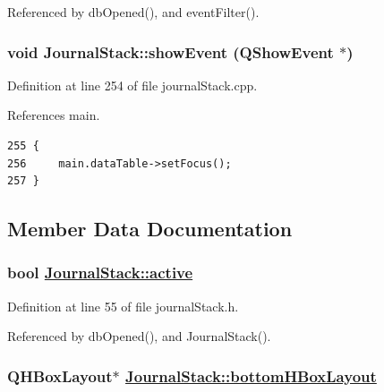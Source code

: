 Referenced by db\-Opened(), and event\-Filter().\hypertarget{classJournalStack_d1}{
\subsubsection[showEvent]{\setlength{\rightskip}{0pt plus 5cm}void Journal\-Stack::show\-Event (QShow\-Event $\ast$)}}
\label{classJournalStack_d1}


Definition at line 254 of file journal\-Stack.cpp.

References main.

\footnotesize\begin{verbatim}255 {
256     main.dataTable->setFocus();
257 }
\end{verbatim}\normalsize 




\subsection{Member Data Documentation}
\hypertarget{classJournalStack_r5}{
\subsubsection[active]{\setlength{\rightskip}{0pt plus 5cm}bool \hyperlink{classJournalStack_r5}{Journal\-Stack::active}}}
\label{classJournalStack_r5}


Definition at line 55 of file journal\-Stack.h.

Referenced by db\-Opened(), and Journal\-Stack().\hypertarget{classJournalStack_r16}{
\subsubsection[bottomHBoxLayout]{\setlength{\rightskip}{0pt plus 5cm}QHBox\-Layout$\ast$ \hyperlink{classJournalStack_r16}{Journal\-Stack::bottom\-HBox\-Layout}}}
\label{classJournalStack_r16}


